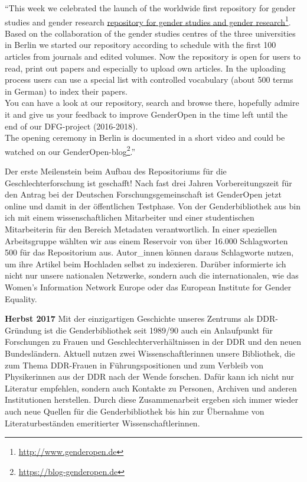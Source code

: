 \documentclass[a4paper,
fontsize=11pt,
oneside,
numbers=noperiodatend,
parskip=half-,
bibliography=totoc,
final
]{scrartcl}
\begin{document}
\enquote{This week we celebrated the launch of the worldwide first
repository for gender studies and gender research
\href{http://www.genderopen.de/}{repository for gender studies and
gender research}\footnote{\url{http://www.genderopen.de}}. Based on the
collaboration of the gender studies centres of the three universities in
Berlin we started our repository according to schedule with the first
100 articles from journals and edited volumes. Now the repository is
open for users to read, print out papers and especially to upload own
articles. In the uploading process users can use a special list with
controlled vocabulary (about 500 terms in German) to index their
papers.\\
You can have a look at our repository, search and browse there,
hopefully admire it and give us your feedback to improve GenderOpen in
the time left until the end of our DFG-project (2016-2018).\\
The opening ceremony in Berlin is documented in a short video and could
be watched on our GenderOpen-blog\footnote{\url{https://blog-genderopen.de}}.}

Der erste Meilenstein beim Aufbau des Repositoriums für die
Geschlechterforschung ist geschafft! Nach fast drei Jahren
Vorbereitungszeit für den Antrag bei der Deutschen
Forschungsgemeinschaft ist GenderOpen jetzt online und damit in der
öffentlichen Testphase. Von der Genderbibliothek aus bin ich mit einem
wissenschaftlichen Mitarbeiter und einer studentischen Mitarbeiterin für
den Bereich Metadaten verantwortlich. In einer speziellen Arbeitsgruppe
wählten wir aus einem Reservoir von über 16.000 Schlagworten 500 für das
Repositorium aus. Autor\_innen können daraus Schlagworte nutzen, um ihre
Artikel beim Hochladen selbst zu indexieren. Darüber informierte ich
nicht nur unsere nationalen Netzwerke, sondern auch die internationalen,
wie das Women's Information Network Europe oder das European Institute
for Gender Equality.

\textbf{Herbst 2017} Mit der einzigartigen Geschichte unseres Zentrums
als DDR-Gründung ist die Genderbibliothek seit 1989/90 auch ein
Anlaufpunkt für Forschungen zu Frauen und Geschlechterverhältnissen in
der DDR und den neuen Bundesländern. Aktuell nutzen zwei
Wissenschaftlerinnen unsere Bibliothek, die zum Thema DDR-Frauen in
Führungspositionen und zum Verbleib von Physikerinnen aus der DDR nach
der Wende forschen. Dafür kann ich nicht nur Literatur empfehlen,
sondern auch Kontakte zu Personen, Archiven und anderen Institutionen
herstellen. Durch diese Zusammenarbeit ergeben sich immer wieder auch
neue Quellen für die Genderbibliothek bis hin zur Übernahme von
Literaturbeständen emeritierter Wissenschaftlerinnen.
\end{document}
